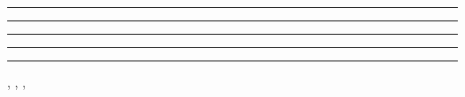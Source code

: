 \clearpage
\thispagestyle{empty}

\newcommand{\backcoverblock}[4]{%
  \begin{otherlanguage}{#1}%
    \noindent\rule{\textwidth}{1.2pt}\par
    \noindent{\large\bfseries #2\par}
    \medskip
    \noindent\textbf{\abstractname}\par
    \par
    \smallskip
    \noindent\textbf{\keywordsname} #4\par
  \end{otherlanguage}%
  \bigskip}

\begingroup
\small
\setlength{\parskip}{0.4em}

\ifthesisfrench
  \backcoverblock{french}{\TitleFR}{frontmatter/resume}{\KeywordsFR}
  \backcoverblock{english}{\TitleEN}{frontmatter/abstract}{\KeywordsEN}
\else
  \backcoverblock{english}{\TitleEN}{frontmatter/abstract}{\KeywordsEN}
  \backcoverblock{french}{\TitleFR}{frontmatter/resume}{\KeywordsFR}
\fi

\vfill
\noindent\rule{\textwidth}{1.2pt}\par
\ifdefempty{\HostName}{}{%
  \noindent\textbf{\hostorganisationname} \HostName
  \ifdefempty{\HostAddress}{}{, \HostAddress}\par}
\noindent\Author, \Degree, \University, \AcademicYear\par
\endgroup
